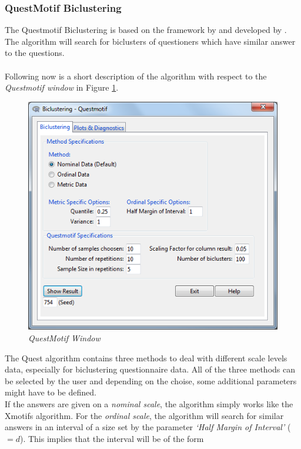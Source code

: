\documentclass[a4paper]{article}\usepackage[]{graphicx}\usepackage[]{color}
\begin{document}
\subsubsection{QuestMotif Biclustering}
The Questmotif Biclustering is based on the framework by \citet{Murali2003} and
developed by \citet{Kaiser2011}. The algorithm will search for biclusters of
questioners which have similar answer to the questions.\ \\ \\
\noindent Following now is a short description of the algorithm with respect to
the {\it Questmotif window} in Figure \ref{questmotif_clusttab}.
\begin{figure}[H]
\centering
\includegraphics[scale=0.5]{figures/questmotif_clusttab.png}
\caption{{\it QuestMotif Window}\label{questmotif_clusttab}}
\end{figure}
\noindent The Quest algorithm contains three methods to deal with different
scale levels data, especially for biclustering questionnaire data. All of the
three methods can be selected by the user and depending on the choise, some
additional parameters might have to be defined.\\
If the answers are given on a {\it nominal scale}, the algorithm simply works
like the Xmotifs algorithm. For the {\it ordinal scale}, the algorithm will search for
similar answers in an interval of a size set by the parameter {\it `Half Margin
of Interval'} ($=d$). This implies that the interval will be of the form
\end{document}
